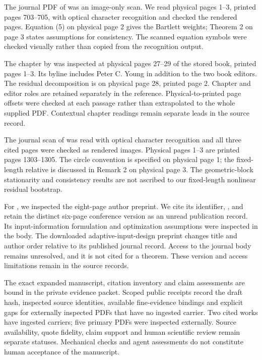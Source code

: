 \documentclass[11pt]{article}
\begin{document}
The journal PDF of \citet{newey-1987-simple} was an image-only scan. We read physical pages
1--3, printed pages 703--705, with optical character recognition and checked
the rendered pages. Equation (5) on physical page 2 gives the Bartlett weights;
Theorem 2 on page 3 states assumptions for consistency. The scanned equation
symbols were checked visually rather than copied from the recognition output.

The chapter by \citet{garnier-2008-direct} was inspected at physical pages 27--29 of the
stored book, printed pages 1--3. Its byline includes Peter C. Young in addition
to the two book editors. The residual decomposition is on physical page 28,
printed page 2. Chapter and editor roles are retained separately in the reference.
Physical-to-printed page offsets were checked at each passage rather than
extrapolated to the whole supplied PDF. Contextual chapter readings remain
separate leads in the source record.

The journal scan of \citet{politis-1994-stationary} was read with optical character recognition and
all three cited pages were checked as rendered images. Physical pages 1--3 are
printed pages 1303--1305. The circle convention is specified on physical page 1;
the fixed-length relative is discussed in Remark 2 on physical page 3. The
geometric-block stationarity and consistency results are not ascribed to our
fixed-length nonlinear residual bootstrap.

For \citet{manchester-2010-input}, we inspected the eight-page author preprint. We cite its
identifier, , and retain the distinct six-page conference
version as an unread publication record.
Its input-information formulation and optimization assumptions were inspected
in the body. The downloaded adaptive-input-design preprint changes title and
author order relative to its published journal record. Access to the journal
body remains unresolved, and it is not cited for a theorem. These version and
access limitations remain in the source records.

The exact expanded manuscript, citation inventory and claim assessments are
bound in the private evidence packet. Scoped public receipts record the draft
hash, inspected source identities, available fine-evidence bindings and explicit
gaps for externally inspected PDFs that have no ingested carrier. Two cited
works have ingested carriers; five primary PDFs were inspected externally.
Source availability, quote fidelity, claim support and human scientific review
remain separate statuses. Mechanical checks and agent assessments do not
constitute human acceptance of the manuscript.
\end{document}
